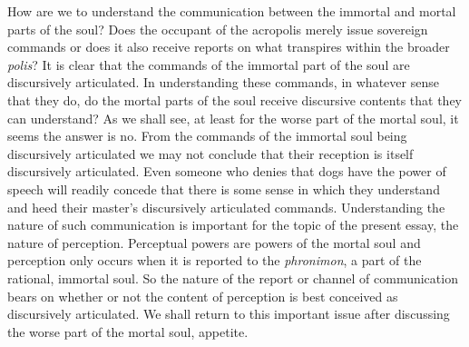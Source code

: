How are we to understand the communication between the immortal and mortal parts of the soul? Does the occupant of the acropolis merely issue sovereign commands or does it also receive reports on what transpires within the broader \emph{polis}? It is clear that the commands of the immortal part of the soul are discursively articulated. In understanding these commands, in whatever sense that they do, do the mortal parts of the soul receive discursive contents that they can understand? As we shall see, at least for the worse part of the mortal soul, it seems the answer is no. From the commands of the immortal soul being discursively articulated we may not conclude that their reception is itself discursively articulated. Even someone who denies that dogs have the power of speech will readily concede that there is some sense in which they understand and heed their master's discursively articulated commands. Understanding the nature of such communication is important for the topic of the present essay, the nature of perception. Perceptual powers are powers of the mortal soul and perception only occurs when it is reported to the \emph{phronimon}, a part of the rational, immortal soul. So the nature of the report or channel of communication bears on whether or not the content of perception is best conceived as discursively articulated. We shall return to this important issue after discussing the worse part of the mortal soul, appetite.

